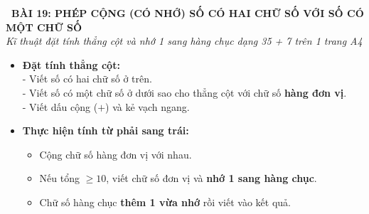 \documentclass[11pt,a4paper]{article}
\begin{document}
\begin{tcolorbox}[
  enhanced,
  colback=violet!8!white,
  colframe=violet!70!black,
  arc=3mm, boxrule=1.2pt,
  left=3mm, right=3mm, top=2mm, bottom=2mm,
  halign=center
]
  {\LARGE\bfseries\color{violet!90!black}\faBookmark\ BÀI 19: PHÉP CỘNG (CÓ NHỚ) SỐ CÓ HAI CHỮ SỐ VỚI SỐ CÓ MỘT CHỮ SỐ}\\[1mm]
  {\itshape\footnotesize\color{black!75} Kĩ thuật đặt tính thẳng cột và nhớ 1 sang hàng chục dạng 35 + 7 trên 1 trang A4}
\end{tcolorbox}

\vspace{-2mm}

\noindent
\begin{minipage}[t]{0.49\textwidth}\vspace{0pt}
\begin{tcolorbox}[
  enhanced,
  colback=violet!4!white,
  colframe=violet!75!black,
  arc=2mm, boxrule=0.8pt,
  left=2mm, right=2mm, top=1.8mm, bottom=1.8mm,
  title={\footnotesize\bfseries\color{white}\faKey\ 1. Quy tắc đặt tính}
]
{\footnotesize
\begin{itemize}\setlength{\itemsep}{1pt}\setlength{\leftskip}{-2.5mm}
  \item \textbf{Đặt tính thẳng cột:}\\
  - Viết số có hai chữ số ở trên.\\
  - Viết số có một chữ số ở dưới sao cho thẳng cột với chữ số \textbf{hàng đơn vị}.\\
  - Viết dấu cộng ($+$) và kẻ vạch ngang.
  \item \textbf{Thực hiện tính từ phải sang trái:}
  \begin{itemize}\setlength{\itemsep}{0.5pt}\setlength{\leftskip}{-2.5mm}
    \item Cộng chữ số hàng đơn vị với nhau.
    \item Nếu tổng $\ge 10$, viết chữ số đơn vị và \textbf{nhớ 1 sang hàng chục}.
    \item Chữ số hàng chục \textbf{thêm 1 vừa nhớ} rồi viết vào kết quả.
  \end{itemize}
\end{itemize}
}
\end{tcolorbox}
\end{minipage}
\hfill
\end{document}
